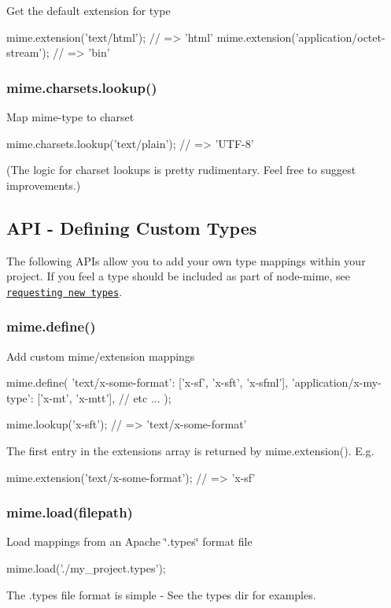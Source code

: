 Get the default extension for {\ttfamily type} \begin{DoxyVerb}mime.extension('text/html');                 // => 'html'
mime.extension('application/octet-stream');  // => 'bin'
\end{DoxyVerb}


\subsubsection*{mime.\+charsets.\+lookup()}

Map mime-\/type to charset \begin{DoxyVerb}mime.charsets.lookup('text/plain');        // => 'UTF-8'
\end{DoxyVerb}


(The logic for charset lookups is pretty rudimentary. Feel free to suggest improvements.)

\subsection*{A\+P\+I -\/ Defining Custom Types}

The following A\+P\+Is allow you to add your own type mappings within your project. If you feel a type should be included as part of node-\/mime, see \href{https://github.com/broofa/node-mime/wiki/Requesting-New-Types}{\tt requesting new types}.

\subsubsection*{mime.\+define()}

Add custom mime/extension mappings \begin{DoxyVerb}mime.define({
    'text/x-some-format': ['x-sf', 'x-sft', 'x-sfml'],
    'application/x-my-type': ['x-mt', 'x-mtt'],
    // etc ...
});

mime.lookup('x-sft');                 // => 'text/x-some-format'
\end{DoxyVerb}


The first entry in the extensions array is returned by {\ttfamily mime.\+extension()}. E.\+g. \begin{DoxyVerb}mime.extension('text/x-some-format'); // => 'x-sf'
\end{DoxyVerb}


\subsubsection*{mime.\+load(filepath)}

Load mappings from an Apache \char`\"{}.\+types\char`\"{} format file \begin{DoxyVerb}mime.load('./my_project.types');
\end{DoxyVerb}


The .types file format is simple -\/ See the {\ttfamily types} dir for examples. 
